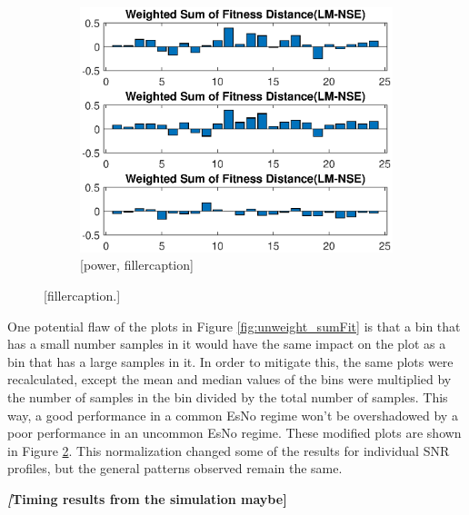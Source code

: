 \begin{figure}[ht!]
\begin{center}
\begin{subfigure}{0.55\linewidth}
	\centering
	\includegraphics[scale=0.6]{figures/c_sim_results/power_weighted_sumFitness.eps}
	\caption{[power, fillercaption]}
	\label{fig:cSimWeightPower}
\end{subfigure}
\end{center}
\caption{[fillercaption.]}
\label{fig:weight_sumFit}
\end{figure}

\par One potential flaw of the plots in Figure \ref{fig:unweight_sumFit} is that a bin that has a small number samples in it would have the same impact on the plot as a bin that has a large samples in it. In order to mitigate this, the same plots were recalculated, except the mean and median values of the bins were multiplied by the number of samples in the bin divided by the total number of samples. This way, a good performance in a common EsNo regime won't be overshadowed by a poor performance in an uncommon EsNo regime. These modified plots are shown in Figure \ref{fig:weight_sumFit}. This normalization changed some of the results for individual SNR profiles, but the general patterns observed remain the same.
\par \textbf{\textit[Timing results from the simulation maybe]}
\clearpage
